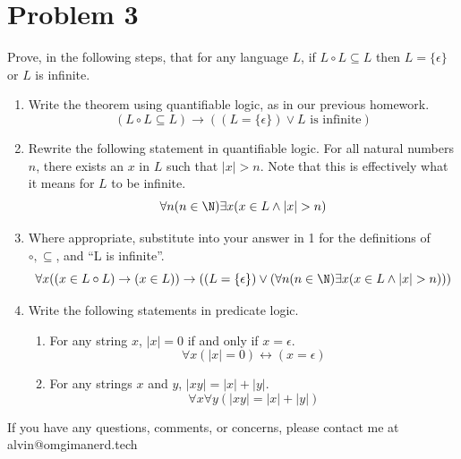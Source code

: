 \documentclass{math}
\begin{document}
\section*{Problem 3}
Prove, in the following steps, that for any language \( L \), if
\( L\circ L\subseteq L \) then \( L = \{\epsilon\} \) or \( L \) is
infinite.
\begin{enumerate}
  \item Write the theorem using quantifiable logic, as in our previous
    homework.
    \[ (L\circ L\subseteq L)\to((L =
      \{\epsilon\}) \vee L \text{ is infinite}) \]
  \item Rewrite the following statement in quantifiable logic. For all natural
    numbers \( n \), there exists an \( x \) in \( L \) such that \( |x|>n \).
    Note that this is effectively what it means for \( L \) to be infinite.
    \[ \forall{n}(n\in\N)\exists{x}(x\in L\wedge |x|>n) \]
  \item Where appropriate, substitute into your answer in 1 for the definitions
    of \( \circ,\subseteq \), and ``L is infinite''.
    \[ \forall{x}((x\in L\circ L)\to(x\in L))\to((L =
      \{\epsilon\})\vee(\forall{n}(n\in\N)\exists{x}(x\in L\wedge |x|>n))) \]
  \item Write the following statements in predicate logic.
    \begin{enumerate}
      \item For any string \( x \), \( |x| = 0 \) if and only if
        \( x = \epsilon \).
        \[ \forall{x}(|x| = 0)\leftrightarrow(x = \epsilon) \]
      \item For any strings \( x \) and \( y \), \( |xy| = |x|+|y| \).
        \[ \forall{x}\forall{y}(|xy| = |x|+|y|) \]
    \end{enumerate}
\end{enumerate}

\begin{center}
  If you have any questions, comments, or concerns, please contact me at
  alvin@omgimanerd.tech
\end{center}
\end{document}
